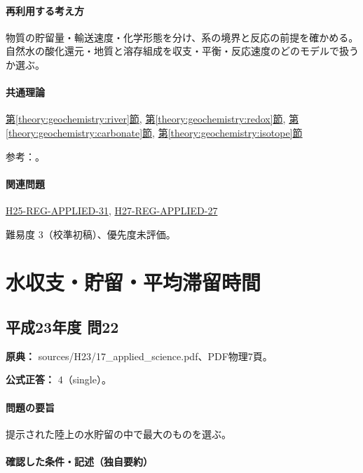 \paragraph{再利用する考え方} 物質の貯留量・輸送速度・化学形態を分け、系の境界と反応の前提を確かめる。自然水の酸化還元・地質と溶存組成を収支・平衡・反応速度のどのモデルで扱うか選ぶ。

\paragraph{共通理論} \hyperref[theory:geochemistry:river]{第\ref*{theory:geochemistry:river}節}, \hyperref[theory:geochemistry:redox]{第\ref*{theory:geochemistry:redox}節}, \hyperref[theory:geochemistry:carbonate]{第\ref*{theory:geochemistry:carbonate}節}, \hyperref[theory:geochemistry:isotope]{第\ref*{theory:geochemistry:isotope}節}

\par 参考：\cite{gc_hem,gc_river1970,gc_redox,gc_meteoric}。

\paragraph{関連問題} \hyperref[q:h25-reg-applied-31]{H25-REG-APPLIED-31}, \hyperref[q:h27-reg-applied-27]{H27-REG-APPLIED-27}

\par 難易度 3（校準初稿）、優先度未評価。

\section{水収支・貯留・平均滞留時間}

\subsection{平成23年度 問22}
\label{q:h23-reg-applied-22}

\noindent\textbf{原典：} sources/H23/17\_applied\_science.pdf、PDF物理7頁。

\textbf{公式正答：} 4（single）。

\paragraph{問題の要旨} 提示された陸上の水貯留の中で最大のものを選ぶ。

\paragraph{確認した条件・記述（独自要約）}\mbox{}\par

